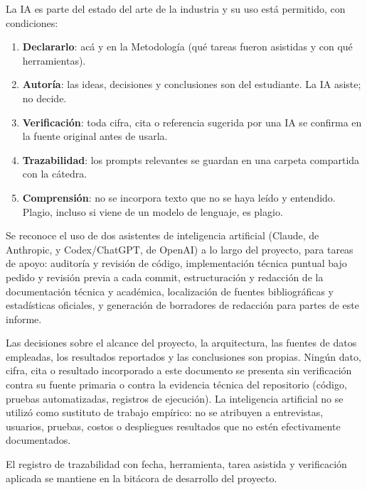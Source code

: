 
\begin{guia}
La IA es parte del estado del arte de la industria y su uso está
permitido, con condiciones:
\begin{enumerate}
    \item \textbf{Declararlo}: acá y en la Metodología (qué tareas fueron
          asistidas y con qué herramientas).
    \item \textbf{Autoría}: las ideas, decisiones y conclusiones son del
          estudiante. La IA asiste; no decide.
    \item \textbf{Verificación}: toda cifra, cita o referencia sugerida por
          una IA se confirma en la fuente original antes de usarla.
    \item \textbf{Trazabilidad}: los prompts relevantes se guardan en una
          carpeta compartida con la cátedra.
    \item \textbf{Comprensión}: no se incorpora texto que no se haya leído
          y entendido. Plagio, incluso si viene de un modelo de lenguaje,
          es plagio.
\end{enumerate}
\end{guia}

Se reconoce el uso de dos asistentes de inteligencia artificial
(Claude, de Anthropic, y Codex/ChatGPT, de OpenAI) a lo largo del
proyecto, para tareas de apoyo: auditoría y revisión de código,
implementación técnica puntual bajo pedido y revisión previa a cada
commit, estructuración y redacción de la documentación técnica y
académica, localización de fuentes bibliográficas y estadísticas
oficiales, y generación de borradores de redacción para partes de este
informe.

Las decisiones sobre el alcance del proyecto, la arquitectura, las
fuentes de datos empleadas, los resultados reportados y las conclusiones
son propias. Ningún dato, cifra, cita o resultado incorporado a este
documento se presenta sin verificación contra su fuente primaria o
contra la evidencia técnica del repositorio (código, pruebas
automatizadas, registros de ejecución). La inteligencia artificial no se
utilizó como sustituto de trabajo empírico: no se atribuyen a
entrevistas, usuarios, pruebas, costos o despliegues resultados que no
estén efectivamente documentados.

El registro de trazabilidad con fecha, herramienta, tarea asistida y
verificación aplicada se mantiene en la bitácora de desarrollo del
proyecto.
